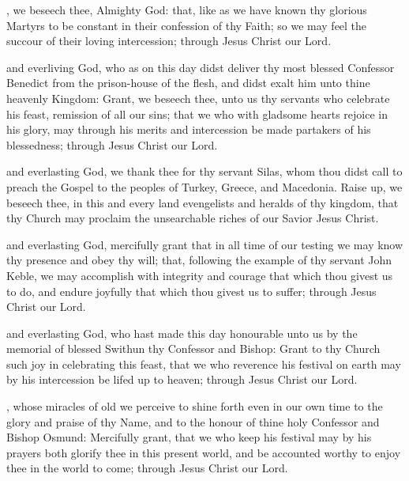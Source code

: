 , we beseech thee, Almighty God: that, like as we have known thy glorious Martyrs to be constant in their confession of thy Faith; so we may feel the succour of their loving intercession; through Jesus Christ our Lord.

 and everliving God, who as on this day didst deliver thy most blessed Confessor Benedict from the prison-house of the flesh, and didst exalt him unto thine heavenly Kingdom: Grant, we beseech thee, unto us thy servants who celebrate his feast, remission of all our sins; that we who with gladsome hearts rejoice in his glory, may through his merits and intercession be made partakers of his blessedness; through Jesus Christ our Lord.

 and everlasting God, we thank thee for thy servant Silas, whom thou didst call to preach the Gospel to the peoples of Turkey, Greece, and Macedonia. Raise up, we beseech thee, in this and every land evengelists and heralds of thy kingdom, that thy Church may proclaim the unsearchable riches of our Savior Jesus Christ.

 and everlasting God, mercifully grant that in all time of our testing we may know thy presence and obey thy will; that, following the example of thy servant John Keble, we may accomplish with integrity and courage that which thou givest us to do, and endure joyfully that which thou givest us to suffer; through Jesus Christ our Lord.

 and everlasting God, who hast made this day honourable unto us by the memorial of blessed Swithun thy Confessor and Bishop: Grant to thy Church such joy in celebrating this feast, that we who reverence his festival on earth may by his intercession be lifed up to heaven; through Jesus Christ our Lord.

, whose miracles of old we perceive to shine forth even in our own time to the glory and praise of thy Name, and to the honour of thine holy Confessor and Bishop Osmund: Mercifully grant, that we who keep his festival may by his prayers both glorify thee in this present world, and be accounted worthy to enjoy thee in the world to come; through Jesus Christ our Lord.


